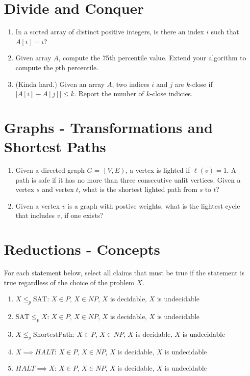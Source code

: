 \documentclass[fleqn]{article}
\begin{document}
\section{Divide and Conquer}
\begin{enumerate}
    \item In a sorted array of distinct positive integers, is there an index $i$ such that $A[i] = i$?
    \item Given array $A$, compute the 75th percentile value. Extend your algorithm to compute the $p$th percentile.
    \item (Kinda hard.) Given an array $A$, two indices $i$ and $j$ are $k$-close if $|A[i] - A[j]| \leq k$. Report the number of $k$-close indicies.
\end{enumerate}

\section{Graphs - Transformations and Shortest Paths}
\begin{enumerate}
    \item Given a directed graph $G = (V, E)$, a vertex is lighted if $\ell(v) = 1$. A path is safe if it has no more than three consecutive unlit vertices. Given a vertex $s$ and vertex $t$, what is the shortest lighted path from $s$ to $t$?
    \item Given a vertex $v$ is a graph with postive weights, what is the lightest cycle that includes $v$, if one exists?
\end{enumerate}

\section{Reductions - Concepts}
For each statement below, select all claims that must be true if the statement is true regardless of the choice of the problem $X$.
\begin{enumerate}
    \item $X \leq_p \text{SAT}$: $X \in P$, $X \in NP$, $X$ is decidable, $X$ is undecidable
    \item $\text{SAT} \leq_p X$: $X \in P$, $X \in NP$, $X$ is decidable, $X$ is undecidable
    \item $X \leq_p \text{ShortestPath}$: $X \in P$, $X \in NP$, $X$ is decidable, $X$ is undecidable
    \item $X \implies HALT$: $X \in P$, $X \in NP$, $X$ is decidable, $X$ is undecidable
    \item $HALT \implies X$: $X \in P$, $X \in NP$, $X$ is decidable, $X$ is undecidable
\end{enumerate}
\end{document}
